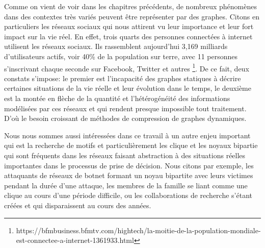 
Comme on vient de voir dans les chapitres précédents, de nombreux phénomènes dans des contextes très variés peuvent être représenter par des graphes. Citons en particuliers les réseaux sociaux qui nous attirent vu leur importance et leur fort impact sur la vie réel. En effet, trois quarts des personnes connectées à internet utilisent les réseaux sociaux. Ils rassemblent aujourd'hui 3,169 milliards d'utilisateurs actifs, voir 40\% de la population sur terre, avec 11 personnes s'inscrivant chaque seconde sur Facebook, Twitter et autres
\footnote{https://bfmbusiness.bfmtv.com/hightech/la-moitie-de-la-population-mondiale-est-connectee-a-internet-1361933.html}. De ce fait, deux constats s'impose: le premier est l'incapacité des graphes statiques à décrire certaines situations de la vie réelle et leur évolution dans le temps, le deuxième est la montée en flèche de la quantité et l'hétérogénéité des informations modélisées par ces réseaux et qui rendent presque impossible tout traitement. D'où le besoin croissant de méthodes de compression de graphes dynamiques. 

Nous nous sommes aussi intéressées dans ce travail à un autre enjeu important qui est la recherche de motifs et particulièrement les clique et les noyaux bipartie qui sont fréquents dans les réseaux faisant abstraction à des situations réelles importantes dans le processus de prise de décision. Nous citons par exemple, les attaquants de réseaux de botnet formant un noyau bipartite avec leurs victimes pendant la durée d'une attaque, les membres de la famille se liant comme une clique au cours d'une période difficile, ou les collaborations de recherche s'étant créées et qui disparaissent au cours des années.


